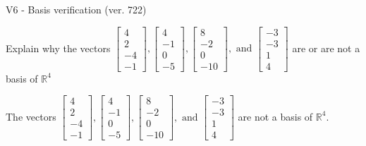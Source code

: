 \begin{exercise}
  \begin{exerciseTitle}V6 - Basis verification (ver. 722)\end{exerciseTitle}
  \begin{exerciseStatement}
    Explain why the vectors \(\left[\begin{array}{r}
4 \\
2 \\
-4 \\
-1
\end{array}\right] , \left[\begin{array}{r}
4 \\
-1 \\
0 \\
-5
\end{array}\right] , \left[\begin{array}{r}
8 \\
-2 \\
0 \\
-10
\end{array}\right] , \text{ and } \left[\begin{array}{r}
-3 \\
-3 \\
1 \\
4
\end{array}\right]\) are or are not a basis of \(\mathbb{R}^4\)	


  \end{exerciseStatement}
  \begin{exerciseAnswer}
   The vectors \(\left[\begin{array}{r}
4 \\
2 \\
-4 \\
-1
\end{array}\right] , \left[\begin{array}{r}
4 \\
-1 \\
0 \\
-5
\end{array}\right] , \left[\begin{array}{r}
8 \\
-2 \\
0 \\
-10
\end{array}\right] , \text{ and } \left[\begin{array}{r}
-3 \\
-3 \\
1 \\
4
\end{array}\right]\) 
  	 are not  a basis of \(\mathbb{R}^4\).
  


  \end{exerciseAnswer}
\end{exercise}